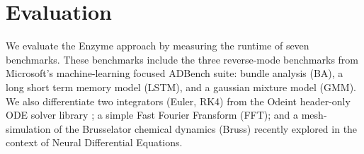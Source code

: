 \section{Evaluation}
\label{sec:eval}



We evaluate the Enzyme approach by measuring the runtime of seven benchmarks. These benchmarks include the three reverse-mode benchmarks from Microsoft's machine-learning focused ADBench suite: bundle analysis (BA), a long short term memory model (LSTM), and a gaussian mixture model (GMM). We also differentiate two integrators (Euler, RK4) from the Odeint header-only ODE solver library \cite{ahnert2011odeint}; a simple Fast Fourier Fransform (FFT); and a mesh-simulation of the Brusselator chemical dynamics (Bruss) \cite{feinberg1987chemical} recently explored in the context of Neural Differential Equations\cite{rackauckas2020universal}.


